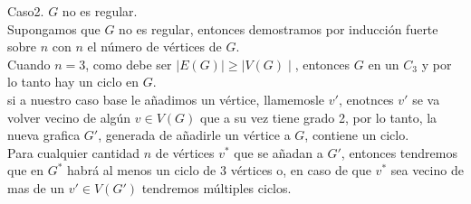 \documentclass[12pt]{article}
\begin{document}
Caso2. $G$ no es regular.\\

Supongamos que $G$ no es regular, entonces demostramos por inducción fuerte sobre $n$ con $n$ 
el número de vértices de $G$.\\

Cuando $n = 3$, como debe ser $\mid E(G) \mid \geq \mid V(G) \mid$, entonces $G$ en un $C_3$ y por lo tanto hay un ciclo en $G$.\\

si a nuestro caso base le añadimos un vértice, llamemosle $v'$, enotnces $v'$ se va volver vecino 
de algún $v \in V(G)$ que a su vez tiene grado 2, por lo tanto, la nueva grafica $G'$, generada de añadirle un vértice 
a $G$, contiene un ciclo.\\

Para cualquier cantidad $n$ de vértices $v^{\ast}$ que se añadan a $G'$, entonces tendremos que en $G^{\ast}$ habrá al menos
un ciclo de 3 vértices o, en caso de que $v^{\ast}$ sea vecino de mas de un $v' \in V(G')$ tendremos múltiples ciclos.
\end{document}
